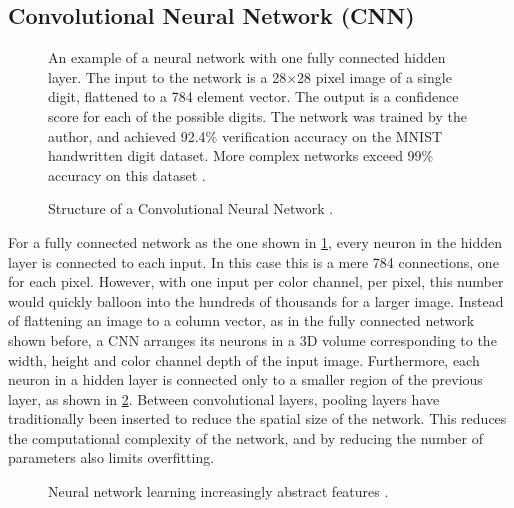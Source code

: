 \documentclass[\rootfolder/main.tex]{subfiles}
\begin{document}
\subsection{Convolutional Neural Network (CNN)}

\begin{figure}
    \caption[An example of a neural network with one fully connected hidden layer]%
        {An example of a neural network with one fully connected hidden layer. %
         The input to the network is a 28$\times$28 pixel image of a single digit, flattened to a 784 element vector. %
         The output is a confidence score for each of the possible digits. %
         The network was trained by the author, and achieved 92.4\% verification accuracy on the MNIST handwritten digit dataset. %
         More complex networks exceed 99\% accuracy on this dataset \cite{mnist2010}.\label{fig:mnist-net}}
\end{figure}

\begin{figure}
    \caption{Structure of a Convolutional Neural Network \cite{Mathworks}.\label{fig:cnn-classification}}
\end{figure}

For a fully connected network as the one shown in \cref{fig:mnist-net}, every neuron in the hidden layer is connected to each input.
In this case this is a mere 784 connections, one for each pixel.
However, with one input per color channel, per pixel, this number would quickly balloon into the hundreds of thousands for a larger image.
Instead of flattening an image to a column vector, as in the fully connected network shown before, a CNN arranges its neurons in a 3D volume corresponding to the width, height and color channel depth of the input image.
Furthermore, each neuron in a hidden layer is connected only to a smaller region of the previous layer, as shown in \cref{fig:cnn-classification}.
Between convolutional layers, pooling layers have traditionally been inserted to reduce the spatial size of the network.
This reduces the computational complexity of the network, and by reducing the number of parameters also limits overfitting.

\begin{figure}
    \caption{Neural network learning increasingly abstract features \cite{Brown2015}.\label{fig:abstract-features}}
\end{figure}
\end{document}
